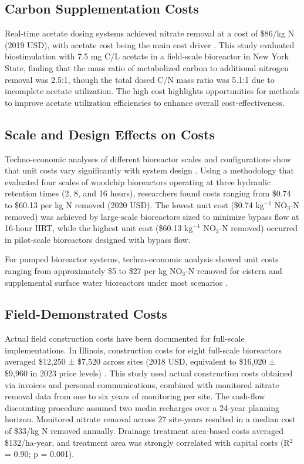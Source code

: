 \documentclass[12pt,a4paper]{article}
\begin{document}
\subsection{Carbon Supplementation Costs}

Real-time acetate dosing systems achieved nitrate removal at a cost of \$86/kg N (2019 USD), with acetate cost being the main cost driver \citep{RN242}. This study evaluated biostimulation with 7.5 mg C/L acetate in a field-scale bioreactor in New York State, finding that the mass ratio of metabolized carbon to additional nitrogen removal was 2.5:1, though the total dosed C/N mass ratio was 5.1:1 due to incomplete acetate utilization. The high cost highlights opportunities for methods to improve acetate utilization efficiencies to enhance overall cost-effectiveness.

\subsection{Scale and Design Effects on Costs}

Techno-economic analyses of different bioreactor scales and configurations show that unit costs vary significantly with system design \citep{RN312}. Using a methodology that evaluated four scales of woodchip bioreactors operating at three hydraulic retention times (2, 8, and 16 hours), researchers found costs ranging from \$0.74 to \$60.13 per kg N removed (2020 USD). The lowest unit cost (\$0.74 kg$^{-1}$ NO$_3$-N removed) was achieved by large-scale bioreactors sized to minimize bypass flow at 16-hour HRT, while the highest unit cost (\$60.13 kg$^{-1}$ NO$_3$-N removed) occurred in pilot-scale bioreactors designed with bypass flow.

For pumped bioreactor systems, techno-economic analysis showed unit costs ranging from approximately \$5 to \$27 per kg NO$_3$-N removed for cistern and supplemental surface water bioreactors under most scenarios \citep{RN312}.

\subsection{Field-Demonstrated Costs}

Actual field construction costs have been documented for full-scale implementations. In Illinois, construction costs for eight full-scale bioreactors averaged \$12,250 ± \$7,520 across sites (2018 USD, equivalent to \$16,020 ± \$9,960 in 2023 price levels) \citep{RN312}. This study used actual construction costs obtained via invoices and personal communications, combined with monitored nitrate removal data from one to six years of monitoring per site. The cash-flow discounting procedure assumed two media recharges over a 24-year planning horizon. Monitored nitrate removal across 27 site-years resulted in a median cost of \$33/kg N removed annually. Drainage treatment area-based costs averaged \$132/ha-year, and treatment area was strongly correlated with capital costs (R$^2$ = 0.90; p = 0.001).
\end{document}

